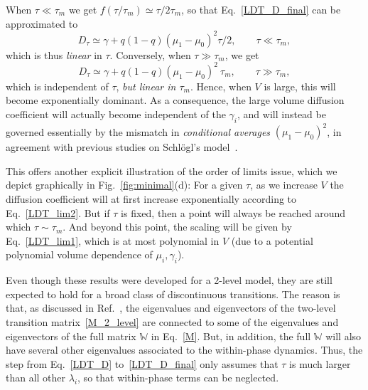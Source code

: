\documentclass[aps,pre,reprint, amsmath, amssymb,superscriptaddress]{revtex4-1}
\begin{document}
When $\tau\ll \tau_m$ we get $f(\tau/\tau_m) \simeq \tau/2\tau_m$,
so that 
Eq.~\eqref{LDT_D_final} can be approximated to 
\begin{equation}\label{LDT_lim1}
    D_\tau \simeq \gamma + q(1-q)(\mu_1-\mu_0)^2 \tau/2, \qquad \tau \ll \tau_m,
\end{equation}
which is thus \emph{linear} in $\tau$.
Conversely, when $\tau \gg \tau_m$, we get 
\begin{equation}\label{LDT_lim2}
    D_\tau \simeq \gamma + q(1-q)(\mu_1-\mu_0)^2 ~\tau_m, 
    \qquad 
    \tau \gg \tau_m,
\end{equation}
which is independent of $\tau$, \emph{but linear in $\tau_m$}. 
Hence, when $V$ is large, this will become exponentially dominant. 
As a consequence, the large volume diffusion coefficient will actually become independent of the $\gamma_i$, and will instead be governed essentially by the mismatch in \emph{conditional averages} $(\mu_1-\mu_0)^2$, in agreement with previous studies on Schl\"ogl's model~\cite{Nguyen2020}. 

This offers another explicit illustration of the  order of  limits issue, which we depict graphically in Fig.~\ref{fig:minimal}(d):
For a given $\tau$, as we increase $V$ the diffusion coefficient will at first increase exponentially according to Eq.~\eqref{LDT_lim2}.
But if $\tau$ is fixed, then a point will always be reached around which $\tau \sim \tau_m$. 
And beyond this point, the scaling will be given by Eq.~\eqref{LDT_lim1}, which is at most polynomial in $V$ (due to a potential  polynomial volume dependence of $\mu_i,\gamma_i$).


Even though these results were developed for a 2-level model, they are still expected to hold for a broad class of discontinuous transitions. 
The reason is that, as discussed in Ref.~\cite{Vellela2009}, the eigenvalues and eigenvectors of the two-level transition matrix~\eqref{M_2_level} are connected to some of the eigenvalues and eigenvectors of the full matrix $\mathbb{W}$ in Eq.~\eqref{M}.
But, in addition, the full $\mathbb{W}$ will also have several other eigenvalues associated to the within-phase dynamics. 
Thus, the step from Eq.~\eqref{LDT_D} to~\eqref{LDT_D_final} only assumes that $\tau$ is much larger than all other $\lambda_i$, so that within-phase terms  can be neglected.
\end{document}
